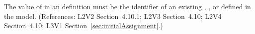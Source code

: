 The value of  in an \InitialAssignment definition must be the
identifier of an existing \Compartment, \Species, \Parameter or 
\SpeciesReference defined in
the model.  (References: L2V2 Section~4.10.1; L2V3
Section~4.10; L2V4 Section~4.10; L3V1 Section~\ref{sec:initialAssignment}.)
